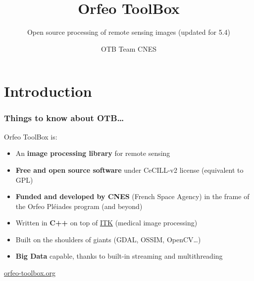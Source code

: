 \documentclass[8pt]{beamer}
\title{Orfeo ToolBox}
\subtitle{Open source processing of remote sensing images (updated for 5.4)}
\author{OTB Team CNES}
\date{}
\begin{document}
\begin{frame}
\titlepage
\end{frame}

\section*{Introduction}

\begin{frame}
\frametitle{Things to know about OTB\ldots}
\begin{block}{Orfeo ToolBox is:}
\begin{itemize}
\item An \textbf{image processing library} for remote sensing
\item \textbf{Free and open source software} under CeCILL-v2 license (equivalent to GPL)
\item \textbf{Funded and developed by CNES} (French Space Agency) in the frame
  of the Orfeo Pléiades program (and beyond)
\item Written in \textbf{C++} on top of \href{www.itk.org}{ITK} (medical image
  processing)
\item Built on the shoulders of giants (GDAL, OSSIM, OpenCV\ldots)
\item \textbf{Big Data} capable, thanks to built-in streaming and multithreading
\end{itemize}
\end{block}

\begin{center}
{\huge\textcolor{red}{\href{http://www.orfeo-toolbox.org}{orfeo-toolbox.org}}}
\end{center}

\end{frame}
\end{document}
